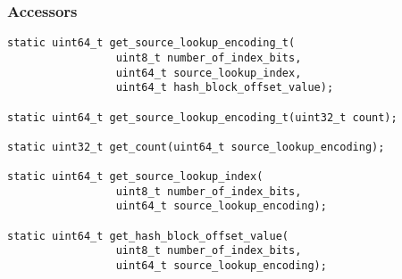 \documentclass[12pt,twoside]{article}
\begin{document}
\subsubsection{Accessors}
\begin{small}
\begin{verbatim}
static uint64_t get_source_lookup_encoding_t(
                 uint8_t number_of_index_bits,
                 uint64_t source_lookup_index,
                 uint64_t hash_block_offset_value);

static uint64_t get_source_lookup_encoding_t(uint32_t count);

static uint32_t get_count(uint64_t source_lookup_encoding);

static uint64_t get_source_lookup_index(
                 uint8_t number_of_index_bits,
                 uint64_t source_lookup_encoding);

static uint64_t get_hash_block_offset_value(
                 uint8_t number_of_index_bits,
                 uint64_t source_lookup_encoding);
\end{verbatim}
\end{small}
\end{document}
